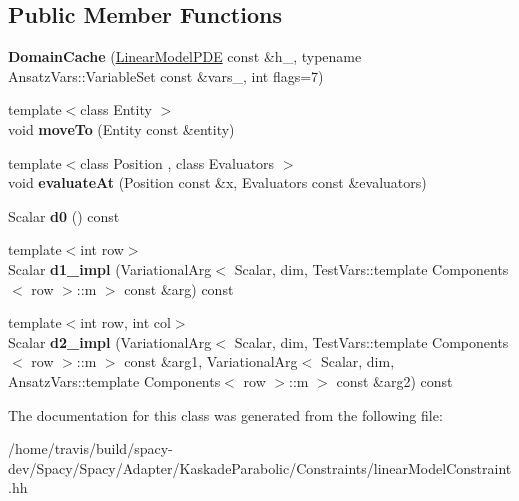 \subsection*{Public Member Functions}
\begin{DoxyCompactItemize}
\item 
\hypertarget{classKaskade_1_1LinearModelPDE_1_1DomainCache_a62786c4de803439eea872b3cb7682220}{{\bfseries Domain\-Cache} (\hyperlink{classKaskade_1_1LinearModelPDE}{Linear\-Model\-P\-D\-E} const \&h\-\_\-, typename Ansatz\-Vars\-::\-Variable\-Set const \&vars\-\_\-, int flags=7)}\label{classKaskade_1_1LinearModelPDE_1_1DomainCache_a62786c4de803439eea872b3cb7682220}

\item 
\hypertarget{classKaskade_1_1LinearModelPDE_1_1DomainCache_ac7f821c0eb9b1ad814ad3c440a1693cf}{{\footnotesize template$<$class Entity $>$ }\\void {\bfseries move\-To} (Entity const \&entity)}\label{classKaskade_1_1LinearModelPDE_1_1DomainCache_ac7f821c0eb9b1ad814ad3c440a1693cf}

\item 
\hypertarget{classKaskade_1_1LinearModelPDE_1_1DomainCache_a5cc67baeb3cfc40a21814d18dbf29202}{{\footnotesize template$<$class Position , class Evaluators $>$ }\\void {\bfseries evaluate\-At} (Position const \&x, Evaluators const \&evaluators)}\label{classKaskade_1_1LinearModelPDE_1_1DomainCache_a5cc67baeb3cfc40a21814d18dbf29202}

\item 
\hypertarget{classKaskade_1_1LinearModelPDE_1_1DomainCache_a02b8cbded72d8c1b1210e94a0eff7f4c}{Scalar {\bfseries d0} () const }\label{classKaskade_1_1LinearModelPDE_1_1DomainCache_a02b8cbded72d8c1b1210e94a0eff7f4c}

\item 
\hypertarget{classKaskade_1_1LinearModelPDE_1_1DomainCache_acef8c07b752d94da52cb49d708dbdd3b}{{\footnotesize template$<$int row$>$ }\\Scalar {\bfseries d1\-\_\-impl} (Variational\-Arg$<$ Scalar, dim, Test\-Vars\-::template Components$<$ row $>$\-::m $>$ const \&arg) const }\label{classKaskade_1_1LinearModelPDE_1_1DomainCache_acef8c07b752d94da52cb49d708dbdd3b}

\item 
\hypertarget{classKaskade_1_1LinearModelPDE_1_1DomainCache_a295cc0fdf790d33fd1e77be0140c6dc5}{{\footnotesize template$<$int row, int col$>$ }\\Scalar {\bfseries d2\-\_\-impl} (Variational\-Arg$<$ Scalar, dim, Test\-Vars\-::template Components$<$ row $>$\-::m $>$ const \&arg1, Variational\-Arg$<$ Scalar, dim, Ansatz\-Vars\-::template Components$<$ row $>$\-::m $>$ const \&arg2) const }\label{classKaskade_1_1LinearModelPDE_1_1DomainCache_a295cc0fdf790d33fd1e77be0140c6dc5}

\end{DoxyCompactItemize}


The documentation for this class was generated from the following file\-:\begin{DoxyCompactItemize}
\item 
/home/travis/build/spacy-\/dev/\-Spacy/\-Spacy/\-Adapter/\-Kaskade\-Parabolic/\-Constraints/linear\-Model\-Constraint.\-hh\end{DoxyCompactItemize}
